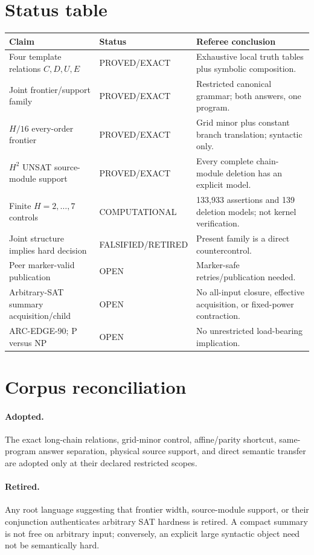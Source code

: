 \documentclass[11pt]{article}
\begin{document}
\section{Status table}
\begin{center}\small
\begin{tabular}{p{.36\linewidth}p{.18\linewidth}p{.35\linewidth}}
\toprule
Claim & Status & Referee conclusion\\\midrule
Four template relations $C,D,U,E$ & PROVED/EXACT & Exhaustive local truth
tables plus symbolic composition.\\
Joint frontier/support family & PROVED/EXACT & Restricted canonical grammar;
both answers, one program.\\
$H/16$ every-order frontier & PROVED/EXACT & Grid minor plus constant branch
translation; syntactic only.\\
$H^2$ UNSAT source-module support & PROVED/EXACT & Every complete chain-module
deletion has an explicit model.\\
Finite $H=2,\ldots,7$ controls & COMPUTATIONAL & 133,933 assertions and 139
deletion models; not kernel verification.\\
Joint structure implies hard decision & FALSIFIED/RETIRED & Present family is
a direct countercontrol.\\
Peer marker-valid publication & OPEN & Marker-safe retries/publication needed.\\
Arbitrary-SAT summary acquisition/child & OPEN & No all-input closure,
effective acquisition, or fixed-power contraction.\\
ARC-EDGE-90; P versus NP & OPEN & No unrestricted load-bearing implication.\\
\bottomrule
\end{tabular}
\end{center}

\section{Corpus reconciliation}
\paragraph{Adopted.}
The exact long-chain relations, grid-minor control, affine/parity shortcut,
same-program answer separation, physical source support, and direct semantic
transfer are adopted only at their declared restricted scopes.
\paragraph{Retired.}
Any root language suggesting that frontier width, source-module support, or
their conjunction authenticates arbitrary SAT hardness is retired.  A compact
summary is not free on arbitrary input; conversely, an explicit large
syntactic object need not be semantically hard.
\end{document}
